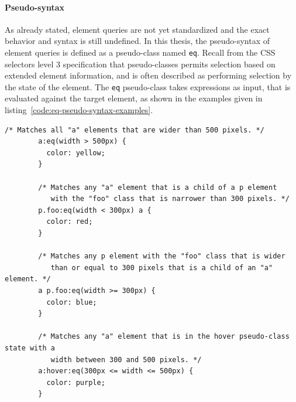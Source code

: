 \documentclass[a4paper,11pt]{kth-mag}
\newcommand{\code}[1]{\texttt{#1}}
\begin{document}
      \paragraph{Pseudo-syntax}
      As already stated, element queries are not yet standardized and the exact behavior and syntax is still undefined.
      In this thesis, the pseudo-syntax of element queries is defined as a pseudo-class named \code{eq}.
      Recall from the \gls{CSS} selectors level 3 specification \cite{w3c_css_selectors} that pseudo-classes permits selection based on extended element information, and is often described as performing selection by the state of the \gls{element}.
      The \code{eq} pseudo-class takes expressions as input, that is evaluated against the target \gls{element}, as shown in the examples given in listing~\ref{code:eq-pseudo-syntax-examples}.
      \begin{lstlisting}[gobble=8,caption={Examples of the element queries pseudo-syntax.}, captionpos=b, label={code:eq-pseudo-syntax-examples}]
        /* Matches all "a" elements that are wider than 500 pixels. */
        a:eq(width > 500px) {
          color: yellow;
        }

        /* Matches any "a" element that is a child of a p element 
           with the "foo" class that is narrower than 300 pixels. */
        p.foo:eq(width < 300px) a {
          color: red;
        }

        /* Matches any p element with the "foo" class that is wider 
           than or equal to 300 pixels that is a child of an "a" element. */
        a p.foo:eq(width >= 300px) {
          color: blue;
        }

        /* Matches any "a" element that is in the hover pseudo-class state with a
           width between 300 and 500 pixels. */
        a:hover:eq(300px <= width <= 500px) {
          color: purple;
        }
      \end{lstlisting}
\end{document}
